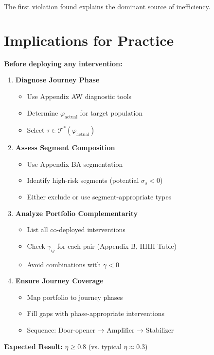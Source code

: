 The first violation found explains the dominant source of inefficiency.


\section{Implications for Practice}
\label{sec:eih-practice}

\begin{tcolorbox}[colback=blue!5!white, colframe=blue!75!black,
    title=The EIH Design Protocol]

\textbf{Before deploying any intervention:}

\begin{enumerate}
\item \textbf{Diagnose Journey Phase}
\begin{itemize}[nosep]
\item Use Appendix AW diagnostic tools
\item Determine $\varphi_{\text{actual}}$ for target population
\item Select $\tau \in \mathcal{T}^*(\varphi_{\text{actual}})$
\end{itemize}

\item \textbf{Assess Segment Composition}
\begin{itemize}[nosep]
\item Use Appendix BA segmentation
\item Identify high-risk segments (potential $\sigma_s < 0$)
\item Either exclude or use segment-appropriate types
\end{itemize}

\item \textbf{Analyze Portfolio Complementarity}
\begin{itemize}[nosep]
\item List all co-deployed interventions
\item Check $\gamma_{ij}$ for each pair (Appendix B, HHH Table)
\item Avoid combinations with $\gamma < 0$
\end{itemize}

\item \textbf{Ensure Journey Coverage}
\begin{itemize}[nosep]
\item Map portfolio to journey phases
\item Fill gaps with phase-appropriate interventions
\item Sequence: Door-opener → Amplifier → Stabilizer
\end{itemize}
\end{enumerate}

\textbf{Expected Result:} $\eta \geq 0.8$ (vs. typical $\eta \approx 0.3$)
\end{tcolorbox}


